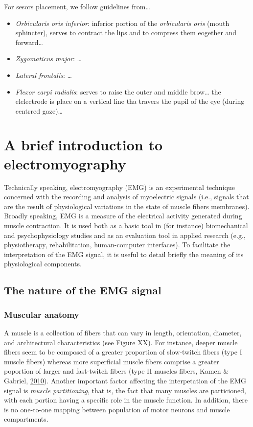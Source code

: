 \documentclass[a4paper,12pt,twoside,openright,oldfontcommands]{memoir}
\begin{document}
For sesors placement, we follow guidelines from\ldots{}

\begin{itemize}
\item
  \emph{Orbicularis oris inferior}: inferior portion of the
  \emph{orbicularis oris} (mouth sphincter), serves to contract the lips
  and to compress them eogether and forward\ldots{}
\item
  \emph{Zygomaticus major}: \ldots{}
\item
  \emph{Lateral frontalis}: \ldots{}
\item
  \emph{Flexor carpi radialis}: serves to raise the outer and middle
  brow\ldots{} the elelectrode is place on a vertical line tha travers
  the pupil of the eye (during centrred gaze)\ldots{}
\end{itemize}

\section{A brief introduction to
electromyography}\label{a-brief-introduction-to-electromyography}

Technically speaking, electromyography (EMG) is an experimental
technique concerned with the recording and analysis of myoelectric
signals (i.e., signals that are the result of physiological variations
in the state of muscle fibers membranes). Broadly speaking, EMG is a
measure of the electrical activity generated during muscle contraction.
It is used both as a basic tool in (for instance) biomechanical and
psychophysiology studies and as an evaluation tool in applied research
(e.g., physiotherapy, rehabilitation, human-computer interfaces). To
facilitate the interpretation of the EMG signal, it is useful to detail
briefly the meaning of its physiological components.

\subsection{The nature of the EMG
signal}\label{the-nature-of-the-emg-signal}

\subsubsection{Muscular anatomy}\label{muscular-anatomy}

A muscle is a collection of fibers that can vary in length, orientation,
diameter, and architectural characteristics (see Figure XX). For
instance, deeper muscle fibers seem to be composed of a greater
proportion of slow-twitch fibers (type I muscle fibers) whereas more
superficial muscle fibers comprise a greater poportion of larger and
fast-twitch fibers (type II muscles fibers, Kamen \& Gabriel,
\protect\hyperlink{ref-kamen_essentials_2010}{2010}). Another important
factor affecting the interpetation of the EMG signal is \emph{muscle
partitioning}, that is, the fact that many muscles are particioned, with
each portion having a specific role in the muscle function. In addition,
there is no one-to-one mapping between population of motor neurons and
muscle compartments.
\end{document}
